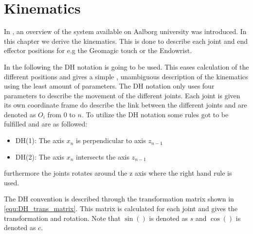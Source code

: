 \chapter{Kinematics}\label{cha:kinematic}

In , an overview of the system available on Aalborg university was introduced. In this chapter we derive the kinematics. This is done to describe each joint and end effector positions for e.g the Geomagic touch or the Endowrist. 

In the following the \gls{DH} notation is going to be used. This eases calculation of the different positions and gives a simple , unambiguous description of the kinematics using the least amount of parameters. The \gls{DH} notation only uses four parameters to describe the movement of the different joints. Each joint is given its own coordinate frame do describe the link between the different joints and are denoted as $O_i$ from 0 to $n$. To utilize the \gls{DH} notation some rules got to be fulfilled and are as followed:

\begin{itemize}
\item DH(1): The axis $x_n$ is perpendicular to axis $z_{n-1}$
\item DH(2): The axis $x_n$ intersects the axis $z_{n-1}$
\end{itemize}

furthermore the joints rotates around the z axis where the right hand rule is used.

The \gls{DH} convention is described through the transformation matrix shown in \eqref{equ:DH_trans_matrix}. This matrix is calculated for each joint and gives the transformation and rotation. Note that $\sin()$ is denoted as $s$ and $\cos()$ is denoted as $c$.

